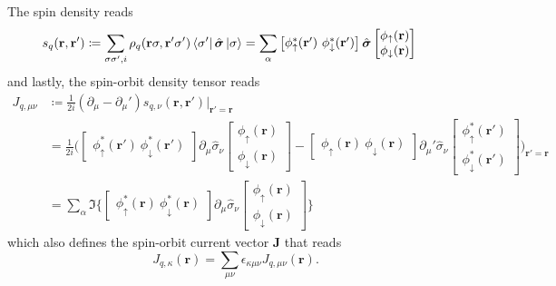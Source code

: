 The spin density  reads
\begin{align}
    s_q(\mathbf r, \mathbf r') &\coloneq\sum_{\sigma \sigma', i} \rho_q(\mathbf r \sigma, \mathbf r' \sigma')\bra{\sigma'} \hat {\boldsymbol{\sigma}} \ket{\sigma} = \sum_{\alpha} \begin{bmatrix} \phi_{\uparrow}^*(\mathbf r') \ \phi_{\downarrow}^*(\mathbf r') \end{bmatrix}\hat{\boldsymbol{\sigma}} \begin{bmatrix} \phi_{\uparrow}(\mathbf r) \\ \phi_{\downarrow}(\mathbf r) \end{bmatrix}
\end{align}
and lastly, the spin-orbit density tensor reads
\begin{align}
    J_{q, \mu\nu} &\coloneq \frac 1 {2i}(\partial_\mu - \partial_\mu') s_{q, \nu}(\mathbf r, \mathbf r')\bigg|_{\mathbf r'=\mathbf r}\nonumber \\
    &= \frac 1 {2i}\bigg(\begin{bmatrix}\phi_{\uparrow}^*(\boldsymbol r')\ \phi_{\downarrow}^*(\boldsymbol r')\end{bmatrix} \partial_\mu\hat{\sigma}_\nu\begin{bmatrix} \phi_{\uparrow}(\mathbf r) \\ \phi_{\downarrow}(\mathbf r) \end{bmatrix} - \begin{bmatrix}\phi_{\uparrow}(\boldsymbol{r})\ \phi_{\downarrow}(\boldsymbol{r})\end{bmatrix} \partial_\mu'\hat{\sigma}_\nu\begin{bmatrix} \phi_{\uparrow}^*(\mathbf r') \\ \phi_{\downarrow}^*(\mathbf r') \end{bmatrix}\bigg)_{\mathbf r'=\mathbf r}\nonumber
     \\&= \sum_\alpha\Im\bigg\{\begin{bmatrix}\phi_{\uparrow}^*(\boldsymbol r)\ \phi_{\downarrow}^*(\boldsymbol r) \end{bmatrix}\partial_\mu \hat{\sigma}_\nu\begin{bmatrix} \phi_{\uparrow}(\mathbf r) \\ \phi_{\downarrow}(\mathbf r) \end{bmatrix}\bigg\}
\end{align}
which also defines the spin-orbit current vector $\bm J$ that reads
\begin{equation}
     J_{q,\kappa} (\bm r ) = \sum_{\mu\nu}\epsilon_{\kappa\mu\nu} J_{q, \mu\nu}(\bm r).
\end{equation}
